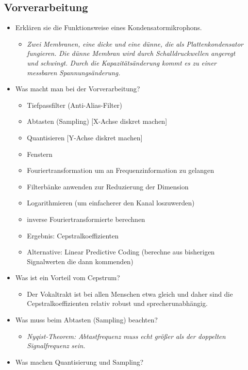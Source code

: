\documentclass[11pt]{article}
\begin{document}
\subsection{Vorverarbeitung}
\begin{itemize}
\item Erklären sie die Funktionsweise eines Kondensatormikrophons.
\begin{itemize}
\item \emph{Zwei Membranen, eine dicke und eine dünne, die als Plattenkondensator fungieren. Die dünne Membran wird durch Schalldruckwellen angeregt und schwingt. Durch die Kapazitätsänderung kommt es zu einer messbaren Spannungsänderung.}
\end{itemize}
\item Was macht man bei der Vorverarbeitung?
\begin{itemize}
\item Tiefpassfilter (Anti-Alias-Filter)
\item Abtasten (Sampling) [X-Achse diskret machen]
\item Quantisieren [Y-Achse diskret machen]
\item Fenstern
\item Fouriertransformation um an Frequenzinformation zu gelangen
\item Filterbänke anwenden zur Reduzierung der Dimension
\item Logarithmieren (um einfacherer den Kanal loszuwerden)
\item inverse Fouriertransformierte berechnen
\item Ergebnis: Cepstralkoeffizienten
\item Alternative: Linear Predictive Coding (berechne aus bisherigen Signalwerten die dann kommenden)
\end{itemize}
\item Was ist ein Vorteil vom Cepstrum? 
\begin{itemize}
\item Der Vokaltrakt ist bei allen Menschen etwa gleich und daher sind die Cepstralkoeffizienten relativ robust und sprecherunabhängig.
\end{itemize}
\item Was muss beim Abtasten (Sampling) beachten?
\begin{itemize}
\item \emph{Nyqist-Theorem: Abtastfrequenz muss echt größer als der doppelten Signalfrequenz sein.}
\end{itemize}
\item Was machen Quantisierung und Sampling?

\end{itemize}
\end{document}
